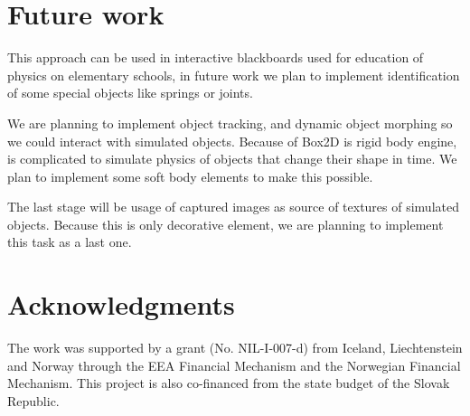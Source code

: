 \documentclass{ifacconf}
\begin{document}
\section{Future work}
This approach can be used in interactive blackboards used for education of
physics on elementary schools, in future work we plan to implement
identification of some special objects like springs or joints.

We are planning to implement object tracking, and dynamic object morphing so we
could interact with simulated objects. Because of Box2D is rigid body engine,
is complicated to simulate physics of objects that change their shape in time.
We plan to implement some soft body elements to make this possible.

The last stage will be usage of captured images as source of textures of
simulated objects. Because this is only decorative element, we are planning to
implement this task as a last one.

\section*{Acknowledgments}
The work was supported by a grant (No. NIL-I-007-d) from Iceland, Liechtenstein 
and Norway through the EEA Financial Mechanism and the Norwegian Financial 
Mechanism. This project is also co-financed from the state budget of the Slovak
Republic.


%
\end{document}
